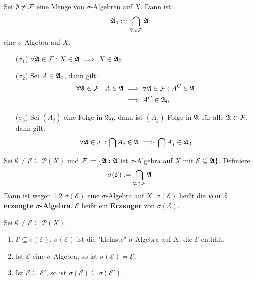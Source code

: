 \documentclass[a4paper,twoside,DIV15,BCOR12mm,chapterprefix=true,headings=onelinechapter]{scrbook}
\begin{document}
\begin{lemma}
Sei $\emptyset\ne\mathcal{F}$ eine Menge von $\sigma$-Algebren auf $X$. Dann ist 
\[\mathfrak{A}_0:=\bigcap_{\mathfrak{A}\in\mathcal{F}}\mathfrak{A}\]
eine $\sigma$-Algebra auf $X$.
\end{lemma}

\begin{beweis}
\begin{enumerate}
\item[($\sigma_1$)] $\forall\mathfrak{A}\in\mathcal{F}:X\in\mathfrak{A}\implies X\in\mathfrak{A}_0$.
\item[($\sigma_2$)] Sei $A\in\mathfrak{A}_0$, dann gilt:
\begin{align*}
\forall\mathfrak{A}\in\mathcal{F}:A\in\mathfrak{A} &\implies \forall\mathfrak{A}\in\mathcal{F}:A^C\in\mathfrak{A}\\
&\implies A^C\in\mathfrak{A}_0
\end{align*}
\item[($\sigma_3$)] Sei $(A_j)$ eine Folge in $\mathfrak{A}_0$, dann ist $(A_j)$ Folge in $\mathfrak{A}$ für alle $\mathfrak{A}\in\mathcal{F}$, dann gilt:
\begin{align*}
\forall\mathfrak{A}\in\mathcal{F}:\bigcap A_j\in\mathfrak{A} \implies \bigcap A_j\in\mathfrak{A}_0
\end{align*}
\end{enumerate}
\end{beweis}

\begin{definition}
Sei $\emptyset\ne\mathcal{E}\subseteq\mathcal{P}(X)$ und $\mathcal{F}:=\{\mathfrak{A}:\mathfrak{A}$ ist $\sigma$-Algebra auf $X$ mit $\mathcal{E}\subseteq\mathfrak{A}\}$. Definiere
\[\sigma(\mathcal{E}):=\bigcap_{\mathfrak{A}\in\mathcal{F}}\mathfrak{A}\]
Dann ist wegen 1.2 $\sigma(\mathcal{E})$ eine $\sigma$-Algebra auf $X$. $\sigma(\mathcal{E})$ heißt die \textbf{von $\mathcal{E}$ erzeugte $\sigma$-Algebra}. $\mathcal{E}$ heißt ein \textbf{Erzeuger} von $\sigma(\mathcal{E})$.
\end{definition}

\begin{lemma}
Sei $\emptyset\ne\mathcal{E}\subseteq\mathcal{P}(X)$.
\begin{enumerate}
\item $\mathcal{E}\subseteq\sigma(\mathcal{E})$. $\sigma(\mathcal{E})$ ist die "kleinste" $\sigma$-Algebra auf $X$, die $\mathcal{E}$ enthält.
\item Ist $\mathcal{E}$ eine $\sigma$-Algebra, so ist $\sigma(\mathcal{E})=\mathcal{E}$.
\item Ist $\mathcal{E}\subseteq\mathcal{E}'$, so ist $\sigma(\mathcal{E})\subseteq\sigma(\mathcal{E}')$.
\end{enumerate}
\end{lemma}
\end{document}
